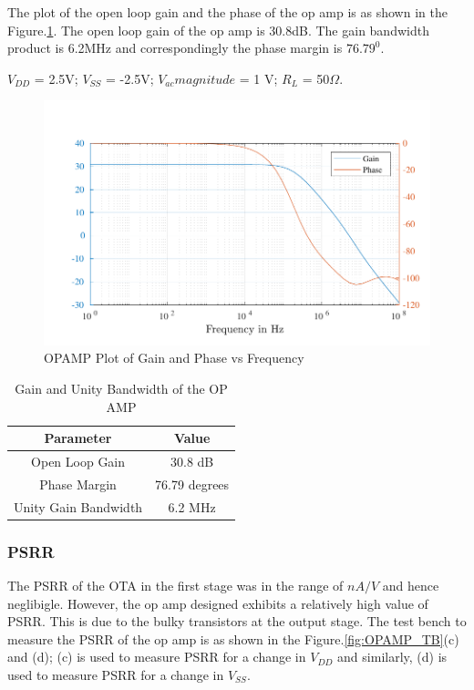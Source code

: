 The plot of the open loop gain and the phase of the op amp is as shown in the Figure.\ref{fig:OPAMP_gain_pm_gbw}. The open loop gain of the op amp is 30.8dB. The gain bandwidth product is 6.2MHz and correspondingly the phase margin is $76.79^0$.

$V_{DD}$ = 2.5V; $V_{SS}$ = -2.5V; $V_{ac} magnitude $ = 1 V; $R_L$ = 50$\Omega$.
\begin{figure} [H]
\centering
\includegraphics[scale=1]{Figures/Plots/OPAMP_Gain_PM.pdf}
\caption{OPAMP Plot of Gain and Phase vs Frequency}
\label{fig:OPAMP_gain_pm_gbw}
\end{figure}

\begin{table} [H]
\centering
\begin{tabular}{@{}cc@{}}
\toprule
Parameter					& Value				\\ \midrule
Open Loop Gain				& 30.8 dB			\\
Phase Margin				& 76.79 degrees		\\
Unity Gain Bandwidth		& 6.2 MHz			\\
\bottomrule
\end{tabular}
\caption{Gain and Unity Bandwidth of the OP AMP}
\label{tab:OPAMP_Gain_UBW}
\end{table}

\subsubsection{PSRR}
The PSRR of the OTA in the first stage was in the range of $nA/V$ and hence neglibigle. However, the op amp designed exhibits a relatively high value of PSRR. This is due to the bulky transistors at the output stage. The test bench to measure the PSRR of the op amp is as shown in the Figure.\ref{fig:OPAMP_TB}(c) and (d); (c) is used to measure PSRR for a change in $V_{DD}$ and similarly, (d) is used to measure PSRR for a change in $V_{SS}$.

